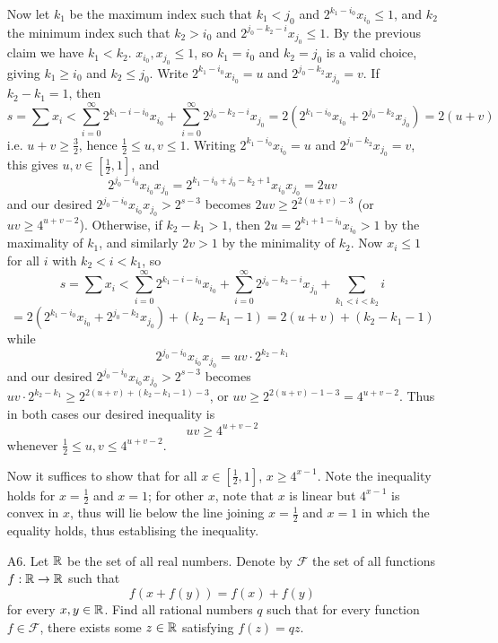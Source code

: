 \documentclass[11pt,a4paper]{article}
\begin{document}
\begin{enumerate}
		Now let $k_1$ be the maximum index such that 
		$k_1 < j_0$ and $2^{k_1 -i_0}x_{i_0}\le 1$, 
		and $k_2$ the minimum index such that $k_2 > i_0$ and 
		$2^{j_0 - k_2 - i}x_{j_0} \le 1$. 
		By the previous claim we have $k_1 < k_2$. 
		$x_{i_0}, x_{j_0}\le 1$, so $k_1=i_0$ and $k_2=j_0$ is a valid choice, 
		giving $k_1\ge i_0$ and $k_2\le j_0$. 
		Write $2^{k_1 -i_0}x_{i_0} = u$ and $2^{j_0 - k_2}x_{j_0} = v$. 
		If $k_2-k_1=1$, then 
		\[
		s = \sum x_i < \sum_{i=0}^{\infty} 2^{k_1 - i -i_0}x_{i_0}
		+ \sum_{i=0}^{\infty} 2^{j_0 - k_2 - i}x_{j_0}
		=2(2^{k_1 -i_0}x_{i_0} + 2^{j_0 - k_2 }x_{j_0})
		=2(u + v)
		\]
		i.e. $u + v\ge \frac 32$, hence $\frac 12\le u, v\le 1$. 
		Writing $2^{k_1 -i_0}x_{i_0} = u$ and $2^{j_0 - k_2}x_{j_0} = v$, this gives $u, v \in [\frac 12, 1]$, and 
		\[
		2^{j_0-i_0}x_{i_0}x_{j_0}
		=2^{k_1 -i_0 + j_0 - k_2 + 1}x_{i_0}x_{j_0}
		=2uv
		\]
		and our desired $2^{j_0-i_0}x_{i_0}x_{j_0} > 2^{s-3}$ becomes $2uv \ge 2^{2(u + v) - 3}$ (or $uv \ge 4^{u + v - 2}$). 
		Otherwise, if $k_2-k_1 > 1$, then 
		$2u = 2^{k_1 + 1 -i_0}x_{i_0} > 1$ by the maximality of $k_1$, 
		and similarly $2v > 1$ by the minimality of $k_2$.
		Now $x_i\le 1$ for all $i$ with $k_2<i<k_1$, so 
		\[
		s =  \sum x_i < \sum_{i=0}^{\infty} 2^{k_1 - i -i_0}x_{i_0}
		+ \sum_{i=0}^{\infty} 2^{j_0 - k_2 - i}x_{j_0} + \sum_{k_1<i<k_2} i
		\]\[
		=2(2^{k_1 -i_0}x_{i_0} + 2^{j_0 - k_2 }x_{j_0}) + (k_2-k_1-1)
		=2(u + v) + (k_2-k_1-1)
		\]
		while
		\[
		2^{j_0-i_0}x_{i_0}x_{j_0}
		=uv \cdot 2^{k_2-k_1}
		\]
		and our desired $2^{j_0-i_0}x_{i_0}x_{j_0} > 2^{s-3}$ becomes 
		$uv \cdot 2^{k_2-k_1}\ge 2^{2(u + v) + (k_2-k_1-1) - 3}$, 
		or $uv\ge 2^{2(u + v) -1 - 3}=4^{u+v-2}$. 
		Thus in both cases our desired inequality is 
		\[
		uv\ge 4^{u+v-2}
		\]
		whenever $\frac 12\le u, v\le 4^{u+v-2}$. 
		
		Now it suffices to show that for all $x\in [\frac 12, 1]$, 
		$x\ge 4^{x - 1}$. Note the inequality holds for $x=\frac 12$ and $x=1$; 
		for other $x$, note that $x$ is linear but $4^{x-1}$ is convex in $x$, thus will lie below the line joining $x=\frac 12$ and $x=1$ in which the equality holds, 
		thus establising the inequality. 
		
		\item[A6.]
		Let ${\mathbb R}$ be the set of all real numbers. 
		Denote by $\mathcal{F}$ the set of all functions $f: {\mathbb R}\to{\mathbb R}$ such that 
		\[
		f(x+f(y)) = f(x) + f(y)
		\]
		for every $x, y\in{\mathbb R}$. 
		Find all rational numbers $q$ such that for every function $f\in\mathcal{F}$, 
		there exists some $z\in{\mathbb R}$ satisfying $f(z)=qz$. 
		

\end{enumerate}
\end{document}
